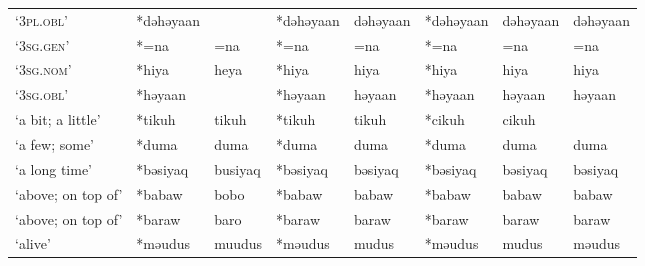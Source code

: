 \begin{landscape}
\begin{longtable}[c]{@{}p{3cm}<{\raggedright}p{2.75cm}<{\raggedright}p{2.75cm}<{\raggedright}p{2.75cm}<{\raggedright}p{2.75cm}<{\raggedright}p{2.75cm}<{\raggedright}p{2.75cm}<{\raggedright}p{2.75cm}<{\raggedright}@{}}
`\textsc{3pl.obl}'                                   & *dəhəyaan    &                               & *dəhəyaan      & dəhəyaan                   & *dəhəyaan        & dəhəyaan                 & dəhəyaan                          \\
`\textsc{3sg.gen}'                                   & *=na         & =na                           & *=na           & =na                        & *=na             & =na                      & =na                               \\
`\textsc{3sg.nom}'                                   & *hiya        & heya                          & *hiya          & hiya                       & *hiya            & hiya                     & hiya                              \\
`\textsc{3sg.obl}'                                   & *həyaan      &                               & *həyaan        & həyaan                     & *həyaan          & həyaan                   & həyaan                            \\
`a bit; a little'                                    & *tikuh       & tikuh                         & *tikuh         & tikuh                      & *cikuh           & cikuh                    &                                   \\
`a few; some'                                        & *duma        & duma                          & *duma          & duma                       & *duma            & duma                     & duma                              \\
`a long time'                                        & *bəsiyaq     & busiyaq                       & *bəsiyaq       & bəsiyaq                    & *bəsiyaq         & bəsiyaq                  & bəsiyaq                           \\
`above; on top of'                                   & *babaw       & bobo                          & *babaw         & babaw                      & *babaw           & babaw                    & babaw                             \\
`above; on top of'                                   & *baraw       & baro                          & *baraw         & baraw                      & *baraw           & baraw                    & baraw                             \\
`alive'                                              & *məudus      & muudus                        & *məudus        & mudus                      & *məudus          & mudus                    & məudus                            \\

\end{longtable}
\end{landscape}

